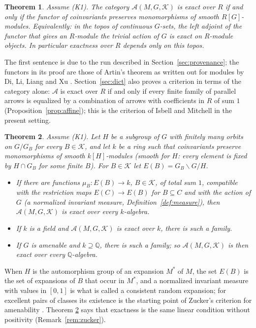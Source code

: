 \documentclass[11pt,a4paper]{article}
\newtheorem{theorem}{Theorem}[section]
\theoremstyle{definition}
\newcommand{\A}{\mathcal{A}}
\newcommand{\K}{\mathcal{K}}
\newcommand{\Q}{\mathbb{Q}}
\begin{document}
\begin{theorem}\label{thm:dict}
Assume \textup{(K1)}. The category $\A(M,G,\K)$ is exact over $R$ if and only
if the functor of coinvariants preserves monomorphisms of smooth
$R[G]$-modules. Equivalently: in the topos of continuous $G$-sets, the left
adjoint of the functor that gives an $R$-module the trivial action of $G$ is
exact on $R$-module objects. In particular exactness over $R$ depends only
on this topos.
\end{theorem}

The first sentence is due to the run described in
Section~\ref{sec:provenance}; the functors in its proof are those of Artin's
theorem as written out for modules by Di, Li, Liang and Xu
\cite[Theorem~5.1]{DLLX}. Section~\ref{sec:dict} also proves a criterion in
terms of the category alone: $\A$ is exact over $R$ if and only if every
finite family of parallel arrows is equalized by a combination of arrows
with coefficients in $R$ of sum $1$ (Proposition~\ref{prop:affine}); this is
the criterion of Isbell and Mitchell \cite{IM} in the present setting.

\begin{theorem}\label{thm:transfer}
Assume \textup{(K1)}. Let $H$ be a subgroup of $G$ with finitely many orbits
on $G/G_B$ for every $B\in\K$, and let $k$ be a ring such that coinvariants
preserve monomorphisms of smooth $k[H]$-modules (smooth for $H$: every element is fixed by $H\cap G_B$ for some finite $B$). For $B\in\K$ let
$E(B)=G_B\backslash G/H$.
\begin{itemize}
\item[\textup{(a)}] If there are functions $\mu_B\colon E(B)\to k$, $B\in\K$,
of total sum $1$, compatible with the restriction maps $E(C)\to E(B)$ for
$B\subseteq C$ and with the action of $G$ \textup{(}a \emph{normalized
invariant measure}, Definition~\textup{\ref{def:measure})}, then
$\A(M,G,\K)$ is exact over every $k$-algebra.
\item[\textup{(b)}] If $k$ is a field and $\A(M,G,\K)$ is exact over $k$,
there is such a family.
\item[\textup{(c)}] If $G$ is amenable and $k\supseteq\Q$, there is such a
family; so $\A(M,G,\K)$ is then exact over every $\Q$-algebra.
\end{itemize}
\end{theorem}

When $H$ is the automorphism group of an expansion $M^*$ of $M$, the set
$E(B)$ is the set of expansions of $B$ that occur in $M^*$, and a normalized
invariant measure with values in $[0,1]$ is what is called a consistent
random expansion; for excellent pairs of classes its existence is the
starting point of Zucker's criterion for amenability
\cite[\S3 and Theorem~3.1]{Zu}. Theorem
\ref{thm:transfer} says that exactness is the same linear condition without
positivity (Remark~\ref{rem:zucker}).
\end{document}
